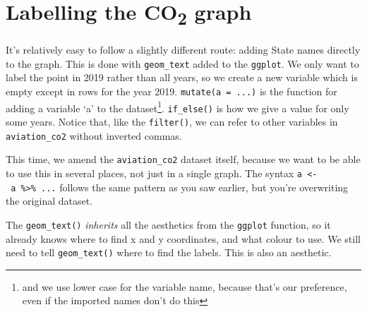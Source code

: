 \documentclass[
]{book}
\begin{document}
\hypertarget{labelling-the-co2-graph}{%
\section{\texorpdfstring{Labelling the CO\textsubscript{2} graph}{Labelling the CO2 graph}}\label{labelling-the-co2-graph}}

It's relatively easy to follow a slightly different route: adding State names directly to the graph. This is done with \texttt{geom\_text} added to the \texttt{ggplot}. We only want to label the point in 2019 rather than all years, so we create a new variable which is empty except in rows for the year 2019. \texttt{mutate(a\ =\ ...)} is the function for adding a variable `a' to the dataset\footnote{and we use lower case for the variable name, because that's our preference, even if the imported names don't do this}. \texttt{if\_else()} is how we give a value for only some years. Notice that, like the \texttt{filter()}, we can refer to other variables in \texttt{aviation\_co2} without inverted commas.

This time, we amend the \texttt{aviation\_co2} dataset itself, because we want to be able to use this in several places, not just in a single graph. The syntax \texttt{a\ \textless{}-\ a\ \%\textgreater{}\%\ ...} follows the same pattern as you saw earlier, but you're overwriting the original dataset.

The \texttt{geom\_text()} \emph{inherits} all the aesthetics from the \texttt{ggplot} function, so it already knows where to find x and y coordinates, and what colour to use. We still need to tell \texttt{geom\_text()} where to find the labels. This is also an aesthetic.
\end{document}
